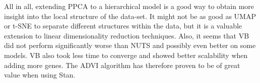 
All in all, extending PPCA to a hierarchical model is a good way to obtain more insight into the local structure of the data-set. It might not be as good as UMAP or t-SNE to separate different structures within the data, but it is a valuable extension to linear dimensionality reduction techniques. Also, it seems that VB did not perform significantly worse than NUTS and possibly even better on some models. VB also took less time to converge and showed better scalability when adding more genes. The ADVI algorithm has therefore proven to be of great value when using Stan.